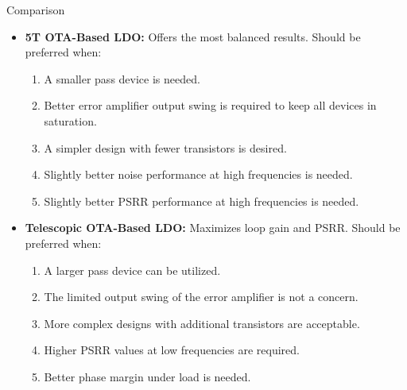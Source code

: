 \documentclass[10pt, aspectratio=169]{beamer}
\begin{document}
\begin{frame}{Comparison}
    \begin{itemize}
        \item \textbf{5T OTA-Based LDO:} Offers the most balanced results. Should be preferred when:
        \begin{enumerate}
            \item A smaller pass device is needed.
            \item Better error amplifier output swing is required to keep all devices in saturation.
            \item A simpler design with fewer transistors is desired.
            \item Slightly better noise performance at high frequencies is needed.
            \item Slightly better PSRR performance at high frequencies is needed.
        \end{enumerate}
        \item \textbf{Telescopic OTA-Based LDO:} Maximizes loop gain and PSRR. Should be preferred when:
        \begin{enumerate}
            \item A larger pass device can be utilized.
            \item The limited output swing of the error amplifier is not a concern.
            \item More complex designs with additional transistors are acceptable.
            \item Higher PSRR values at low frequencies are required.
            \item Better phase margin under load is needed.
        \end{enumerate}
    \end{itemize}
\end{frame}
\end{document}
